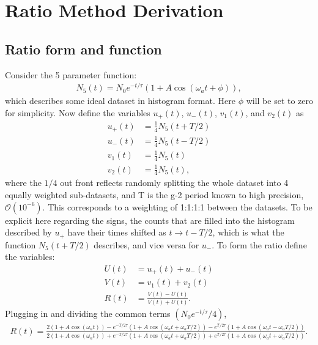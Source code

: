 
\thispagestyle{myheadings}

\chapter{Ratio Method Derivation}
\label{RatioDerivation}

\section{Ratio form and function}

Consider the 5 parameter function:
	\begin{align}
		N_{5}(t) = N_{0}e^{-t/\tau}(1 + A \cos(\omega_{a}t + \phi)),
	\end{align}
which describes some ideal dataset in histogram format. Here $\phi$ will be set to zero for simplicity. Now define the variables $u_{+}(t)$, $u_{-}(t)$, $v_{1}(t)$, and $v_{2}(t)$ as
	\begin{equation}
	\begin{aligned}
		u_{+}(t) &= \frac{1}{4} N_{5}(t+T/2) \\
		u_{-}(t) &= \frac{1}{4} N_{5}(t-T/2) \\
		v_{1}(t) &= \frac{1}{4} N_{5}(t) \\
		v_{2}(t) &= \frac{1}{4} N_{5}(t),
	\end{aligned}
	\end{equation}
where the $1/4$ out front reflects randomly splitting the whole dataset into 4 equally weighted sub-datasets, and T is the g-2 period known to high precision, $\mathcal{O}(10^{-6})$. This corresponds to a weighting of 1:1:1:1 between the datasets. To be explicit here regarding the signs, the counts that are filled into the histogram described by $u_{+}$ have their times shifted as $t \rightarrow t - T/2$, which is what the function $N_{5}(t+T/2)$ describes, and vice versa for $u_{-}$. To form the ratio define the variables:
	\begin{equation}
	\begin{aligned}
		U(t) &= u_{+}(t) + u_{-}(t) \\
		V(t) &= v_{1}(t) + v_{2}(t) \\
		R(t) &= \frac{V(t) - U(t)}{V(t) + U(t)}.
	\label{eq:ratio}
	\end{aligned}
	\end{equation}
Plugging in and dividing the common terms $(N_{0}e^{-t/\tau}/4)$,
	\begin{align}
		R(t) = \frac{2(1 + A \cos(\omega_{a}t)) - e^{-T/ 2\tau} (1 + A \cos(\omega_{a}t + \omega_{a}T/2)) - e^{T/ 2\tau} (1 + A \cos(\omega_{a}t - \omega_{a}T/2))} {2(1 + A \cos(\omega_{a}t)) + e^{-T/ 2\tau} (1 + A \cos(\omega_{a}t + \omega_{a}T/2)) + e^{T/ 2\tau} (1 + A \cos(\omega_{a}t + \omega_{a}T/2))}.
	\end{align}

